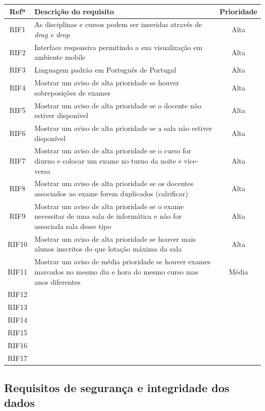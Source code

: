 \documentclass[11pt, twoside]{report}
\begin{document}
		\begin{center}
		\begin{tabularx}{\textwidth}{|c|X|c|}
			\hline
			\textbf{Refª }	& \textbf{Descrição do requisito} & \textbf{Prioridade} \\
			\hline
			RIF1 & As disciplinas e cursos podem ser inseridas através de \textit{drag e drop} &Alta\\
			\hline
			RIF2 & Interface responsiva permitindo a sua visualização em ambiente mobile &Alta\\
			\hline
			RIF3 & Linguagem padrão em Português de Portugal &Alta\\
			\hline
			RIF4 &Mostrar um aviso de alta prioridade se houver sobreposições de exames &Alta\\
			\hline
			RIF5 &Mostrar um aviso de alta prioridade se o docente não estiver disponível&Alta\\
			\hline
			RIF6&Mostrar um aviso de alta prioridade se a sala não estiver disponível&Alta\\
			\hline
			RIF7&Mostrar um aviso de alta prioridade se o curso for diurno e colocar um exame no turno da noite e vice-versa & Alta\\
			\hline
			RIF8&Mostrar um aviso de alta prioridade se os docentes associados ao exame forem duplicados (calrificar)& Alta\\
			\hline
			RIF9&Mostrar um aviso de alta prioridade se o exame necessitar de uma sala de informática e não for associada sala desse tipo&Alta\\
			\hline
			RIF10&Mostrar um aviso de alta prioridade se houver mais alunos inscritos do que  lotação máxima da sala&Alta\\
			\hline
			RIF11&Mostrar um aviso de média prioridade se houver exames marcados no mesmo dia e hora do mesmo curso mas anos diferentes&Média\\
			\hline
			RIF12&&\\
			\hline
			RIF13&&\\
			\hline
			RIF14&&\\
			\hline
			RIF15&&\\
			\hline
			RIF16&&\\
			\hline
			RIF17&&\\
			\hline
		\end{tabularx}
		\label{requisitosdeinterface}
	\end{center}
	\subsection{Requisitos de segurança e integridade dos dados}
	
\end{document}
